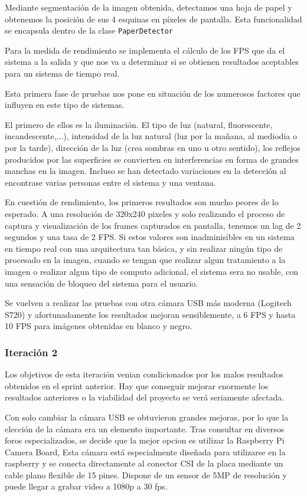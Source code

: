 Mediante segmentación de la imagen obtenida, detectamos una hoja de papel y obtenemos la posición de sus 4 esquinas en píxeles de pantalla. Esta funcionalidad se encapsula dentro de la clase \texttt{PaperDetector}

Para la medida de rendimiento se implementa el cálculo de los FPS que da el sistema a la salida y que nos va a determinar si se obtienen resultados aceptables para un sistema de tiempo real.

Esta primera fase de pruebas nos pone en situación de los numerosos factores que influyen en este tipo de sistemas.

El primero de ellos es la iluminación. El tipo de luz (natural, fluorescente, incandescente,...), intensidad de la luz natural (luz por la mañana, al mediodia o por la tarde), dirección de la luz (crea sombras en uno u otro sentido), los reflejos producidos por las superficies se convierten en interferencias en forma de grandes manchas en la imagen. Incluso se han detectado variaciones en la detección al encontrase varias personas entre el sistema y una ventana.

En cuestión de rendimiento, los primeros resultados son mucho peores de lo esperado. A una resolución de 320x240 pixeles y solo realizando el proceso de captura y visualización de los frames capturados en pantalla, tenemos un lag de 2 segundos y una tasa de 2 FPS. Si estos valores son inadminisibles en un sistema en tiempo real con una arquitectura tan básica, y sin realizar ningún tipo de procesado en la imagen, cuando se tengan que realizar algun tratamiento a la imagen o realizar algun tipo de computo adicional, el sistema sera no usable, con una sensación de bloqueo del sistema para el usuario.   

Se vuelven a realizar las pruebas con otra cámara USB más moderna (Logitech S720) y afortunadamente los resultados mejoran sensiblemente, a 6 FPS y hasta 10 FPS para imágenes obtenidas en blanco y negro.  


\subsubsection{Iteración 2}
Los objetivos de esta iteración venian condicionados por los malos resultados obtenidos en el sprint anterior. Hay que conseguir mejorar enormente los resultados anteriores o la viabilidad del proyecto se verá seriamente afectada.

Con solo cambiar la cámara USB se obtuvieron grandes mejoras, por lo que la elección de la cámara era un elemento importante. Tras consultar en diversos foros especializados, se decide que la mejor opcion es utilizar la Raspberry Pi Camera Board, Esta cámara está especialmente diseñada para utilizarse en la raspberry y se conecta directamente al conector CSI de la placa mediante un cable plano flexible de 15 pines. Dispone de un sensor de 5MP de resolución y  puede llegar a grabar video a 1080p a 30 fps.

